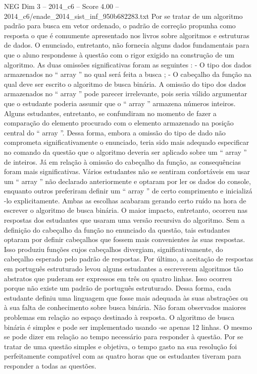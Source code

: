 \begin{textsample}{NEG Dim 3 – 2014\_c6 – Score 4.00 – 2014\_c6/enade\_2014\_sist\_inf\_950b682283.txt}
Por se tratar de um algoritmo padrão para busca em vetor ordenado, o padrão de correção propunha como resposta o que é comumente apresentado nos livros sobre algoritmos e estruturas de dados.
O enunciado, entretanto, não fornecia alguns dados fundamentais para que o aluno respondesse à questão com o rigor exigido na construção de um algoritmo.
As duas omissões significativas foram as seguintes : - O tipo dos dados armazenados no “ array ” no qual será feita a busca ; - O cabeçalho da função na qual deve ser escrito o algoritmo de busca binária.
A omissão do tipo dos dados armazenados no “ array ” pode parecer irrelevante, pois seria válido argumentar que o estudante poderia assumir que o “ array ” armazena números inteiros.
Alguns estudantes, entretanto, se confundiram no momento de fazer a comparação do elemento procurado com o elemento armazenado na posição central do “ array ”.
Dessa forma, embora a omissão do tipo de dado não comprometa significativamente o enunciado, teria sido mais adequado especificar no comando da questão que o algoritmo deveria ser aplicado sobre um “ array ” de inteiros.
Já em relação à omissão do cabeçalho da função, as consequências foram mais significativas.
Vários estudantes não se sentiram confortáveis em usar um “ array ” não declarado anteriormente e optaram por ler os dados do console, enquanto outros preferiram definir um “ array ” de certo comprimento e inicializá -lo explicitamente.
Ambas as escolhas acabaram gerando certo ruído na hora de escrever o algoritmo de busca binária.
O maior impacto, entretanto, ocorreu nas respostas dos estudantes que usaram uma versão recursiva do algoritmo.
Sem a definição do cabeçalho da função no enunciado da questão, tais estudantes optaram por definir cabeçalhos que fossem mais convenientes às suas respostas.
Isso produziu funções cujos cabeçalhos divergiam, significativamente, do cabeçalho esperado pelo padrão de respostas.
Por último, a aceitação de respostas em português estruturado levou alguns estudantes a escreverem algoritmos tão abstratos que puderam ser expressos em três ou quatro linhas.
Isso ocorreu porque não existe um padrão de português estruturado.
Dessa forma, cada estudante definiu uma linguagem que fosse mais adequada às suas abstrações ou à sua falta de conhecimento sobre busca binária.
Não foram observados maiores problemas em relação ao espaço destinado à resposta.
O algoritmo de busca binária é simples e pode ser implementado usando -se apenas 12 linhas.
O mesmo se pode dizer em relação ao tempo necessário para responder à questão.
Por se tratar de uma questão simples e objetiva, o tempo gasto na sua resolução foi perfeitamente compatível com as quatro horas que os estudantes tiveram para responder a todas as questões.

\end{textsample}
